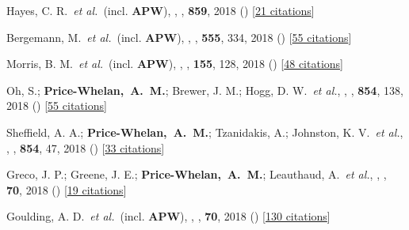 \item[{\color{deemph}\scriptsize39}]Hayes, C. R.~\textit{et al.}~(incl. \textbf{APW}), , \apj, \textbf{859}, 2018 () [\href{http://adsabs.harvard.edu/abs/2018ApJ...859L...8H}{21 citations}]

\item[{\color{deemph}\scriptsize38}]Bergemann, M.~\textit{et al.}~(incl. \textbf{APW}), , \nature, \textbf{555}, 334, 2018 () [\href{http://adsabs.harvard.edu/abs/2018Natur.555..334B}{55 citations}]

\item[{\color{deemph}\scriptsize37}]Morris, B. M.~\textit{et al.}~(incl. \textbf{APW}), , \aj, \textbf{155}, 128, 2018 () [\href{http://adsabs.harvard.edu/abs/2018AJ....155..128M}{48 citations}]

\item[{\color{deemph}\scriptsize36}]Oh, S.; \textbf{Price-Whelan,~A.~M.}; Brewer, J. M.; Hogg, D. W.~\textit{et al.}, , \apj, \textbf{854}, 138, 2018 () [\href{http://adsabs.harvard.edu/abs/2018ApJ...854..138O}{55 citations}]

\item[{\color{deemph}\scriptsize35}]Sheffield, A. A.; \textbf{Price-Whelan,~A.~M.}; Tzanidakis, A.; Johnston, K. V.~\textit{et al.}, , \apj, \textbf{854}, 47, 2018 () [\href{http://adsabs.harvard.edu/abs/2018ApJ...854...47S}{33 citations}]

\item[{\color{deemph}\scriptsize34}]Greco, J. P.; Greene, J. E.; \textbf{Price-Whelan,~A.~M.}; Leauthaud, A.~\textit{et al.}, , \pasj, \textbf{70}, 2018 () [\href{http://adsabs.harvard.edu/abs/2018PASJ...70S..19G}{19 citations}]

\item[{\color{deemph}\scriptsize33}]Goulding, A. D.~\textit{et al.}~(incl. \textbf{APW}), , \pasj, \textbf{70}, 2018 () [\href{http://adsabs.harvard.edu/abs/2018PASJ...70S..37G}{130 citations}]

